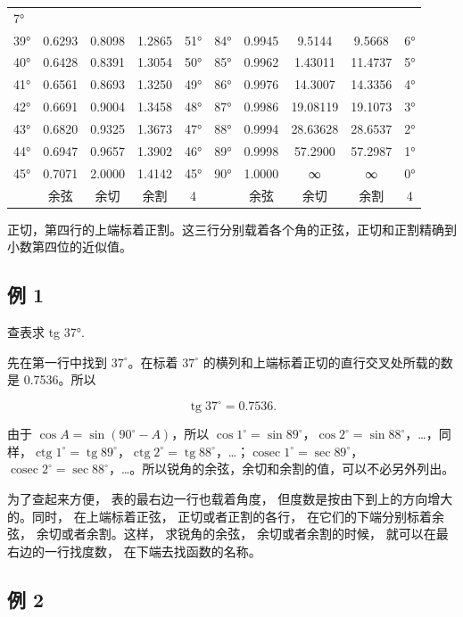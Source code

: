 {\begin{longtable}[]{@{}lccccccccc@{}}
7° \\
39° & 0.6293 & 0.8098 & 1.2865 & 51° & 84° & 0.9945 & 9.5144 & 9.5668 &
6° \\
40° & 0.6428 & 0.8391 & 1.3054 & 50° & 85° & 0.9962 & 1.43011 & 11.4737
& 5° \\
41° & 0.6561 & 0.8693 & 1.3250 & 49° & 86° & 0.9976 & 14.3007 & 14.3356
& 4° \\
42° & 0.6691 & 0.9004 & 1.3458 & 48° & 87° & 0.9986 & 19.08119 & 19.1073
& 3° \\
43° & 0.6820 & 0.9325 & 1.3673 & 47° & 88° & 0.9994 & 28.63628 & 28.6537
& 2° \\
44° & 0.6947 & 0.9657 & 1.3902 & 46° & 89° & 0.9998 & 57.2900 & 57.2987
& 1° \\
45° & 0.7071 & 2.0000 & 1.4142 & 45° & 90° & 1.0000 & ∞ & ∞ & 0° \\
& 余弦 & 余切 & 余割 & 4 & & 余弦 & 余切 & 余割 & 4 \\
\end{longtable}
}

正切，第四行的上端标着正割。这三行分别载着各个角的正弦，正切和正割精确到小数第四位的近似值。

\subsection{例 1}

查表求 tg 37°.

 先在第一行中找到 \(37^{\circ}\)。在标着 \(37^{\circ}\)
的横列和上端标着正切的直行交叉处所载的数是 0.7536。所以

\[
\operatorname{tg} 37 ^{\circ} = 0.7536.
\]

由于 \(\cos A = \sin (90^{\circ} - A)\)，所以
\(\cos 1^{\circ} = \sin 89^{\circ}\)，\(\cos 2^{\circ} = \sin 88^{\circ}\)，\ldots，同样，\(\operatorname{ctg} 1^{\circ} = \operatorname{tg} 89^{\circ}\)，\(\operatorname{ctg} 2^{\circ} = \operatorname{tg} 88^{\circ}\)，\ldots；\(\operatorname{cosec} 1^{\circ} = \sec 89^{\circ}\)，\(\operatorname{cosec} 2^{\circ} = \sec 88^{\circ}\)，\ldots。所以锐角的余弦，余切和余割的值，可以不必另外列出。

为了查起来方便， 表的最右边一行也载着角度，
但度数是按由下到上的方向增大的。同时， 在上端标着正弦，
正切或者正割的各行， 在它们的下端分别标着余弦， 余切或者余割。这样，
求锐角的余弦， 余切或者余割的时候， 就可以在最右边的一行找度数，
在下端去找函数的名称。

\subsection{例 2}

